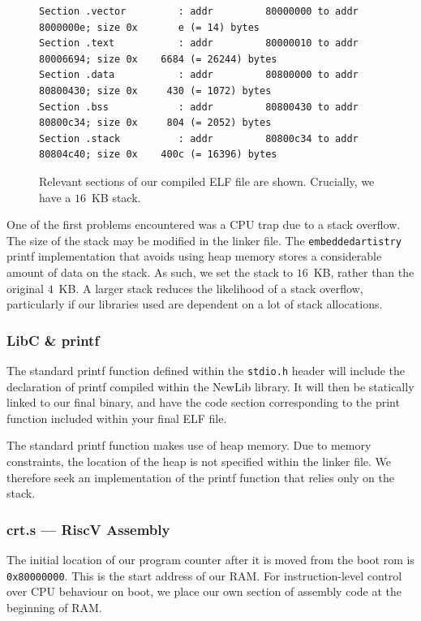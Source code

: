 \documentclass[a4paper,8pt]{report}
\begin{document}
\begin{figure}[h]
  \centering
  \scriptsize
\begin{BVerbatim}
Section .vector         : addr         80000000 to addr         8000000e; size 0x       e (= 14) bytes
Section .text           : addr         80000010 to addr         80006694; size 0x    6684 (= 26244) bytes
Section .data           : addr         80800000 to addr         80800430; size 0x     430 (= 1072) bytes
Section .bss            : addr         80800430 to addr         80800c34; size 0x     804 (= 2052) bytes
Section .stack          : addr         80800c34 to addr         80804c40; size 0x    400c (= 16396) bytes
\end{BVerbatim}
  \normalsize
  \caption{Relevant sections of our compiled ELF file are shown. Crucially, we
    have a $16$~KB stack.}
\end{figure}

One of the first problems encountered was a CPU trap due to a stack overflow.
The size of the stack may be modified in the linker file. The \texttt{embeddedartistry}
printf implementation that avoids using heap memory stores a considerable amount
of data on the stack. As such, we set the stack to $16$~KB, rather than the
original $4$~KB. A larger stack reduces the likelihood of a stack overflow,
particularly if our libraries used are dependent on a lot of stack allocations.

\subsubsection{LibC \& printf}
The standard printf function defined within the \texttt{stdio.h} header will
include the declaration of printf compiled within the NewLib library. It will
then be statically linked to our final binary, and have the code section
corresponding to the print function included within your final ELF file.

The standard printf function makes use of heap memory. Due to memory
constraints, the location of the heap is not specified within the linker file.
We therefore seek an implementation of the printf function that relies only on
the stack. 

\subsubsection{crt.s --- RiscV Assembly}
The initial location of our program counter after it is moved from the boot rom
is \texttt{0x80000000}. This is the start address of our RAM. For
instruction-level control over CPU behaviour on boot, we place our own section
of assembly code at the beginning of RAM.
\end{document}
